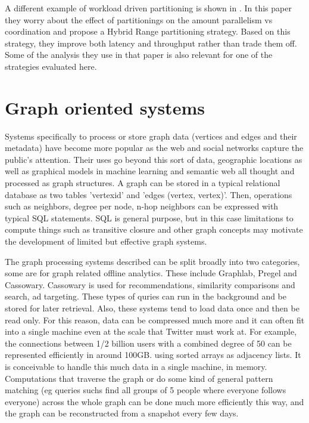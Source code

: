 A different example of workload driven partitioning is shown in  \cite{dewitt}. In this paper they worry about the effect of partitionings on the amount   parallelism vs coordination and propose a Hybrid Range partitioning strategy. Based on this strategy, they improve both latency and throughput rather than trade them off.  Some of the analysis they use in that paper is also relevant for one of the strategies evaluated here.

\section{Graph oriented systems}

Systems specifically to process or store graph data (vertices and edges and their metadata) have become more popular as the web and  social networks capture the public's attention. Their uses go beyond this sort of data, geographic locations as well as graphical models in machine learning and semantic web all thought and processed as  graph structures. A graph can be stored in a typical relational database as two tables 'vertexid' and 'edges (vertex, vertex)'.  Then, operations such as neighbors, degree per node, n-hop neighbors can be expressed with typical SQL statements. SQL is general purpose, but in this case limitations to compute things such as transitive closure and other graph concepts may motivate the development of limited but effective graph systems.

The graph processing systems described can be split broadly into two categories, some are for graph related offline analytics. These include Graphlab, Pregel and Cassowary.
 Cassowary is used for recommendations, similarity comparisons and search, ad targeting. These types of quries can run in the background and be stored for later retrieval. Also, these systems tend to load data once and then be read only. For this reason, data can be compressed much more and it can often fit into a single machine even at the scale that Twitter must work at. For example, the connections between 1/2 billion users with a combined degree of 50 can be represented efficiently in around 100GB.  using  sorted arrays as adjacency lists.   It is conceivable to handle this much data in a single machine, in memory. Computations that traverse the graph or do some kind of general pattern matching (eg queries suchs find all groups of 5 people where everyone follows everyone) across the whole graph can be done much more efficiently this way, and the graph can be reconstructed from a snapshot every few days. 


